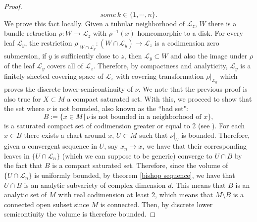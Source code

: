 \documentclass[12pt,twoside,a4paper]{report}
\newcommand{\nat}{\ensuremath{ \mathbb N }}
\begin{document}
\begin{proof}
$${some }\,k\in\lbrace 1,\cdots,n\rbrace.
$$
We prove this fact locally. Given a tubular neighborhood of $\mathcal{L}_z$,
$W$ there is a bundle retraction $\rho: W\rightarrow\mathcal{L}_z$ with $\rho^{-1}(x)$
homeomorphic to a disk. For every leaf $\mathcal{L}_y$, the restriction $\rho\vert_{W\cap\mathcal{L}_y}:(W\cap\mathcal{L}_y)\rightarrow\mathcal{L}_z$
is a codimension zero submersion, if $y$ is sufficiently close to $z$, then
$\mathcal{L}_y\subset W$ and also the image under $\rho$ of the leaf $\mathcal{L}_y$ covers all of $\mathcal{L}_z$.
Therefore, by compactness and analyticity, $\mathcal{L}_y$ is a finitely sheeted covering space of $\mathcal{L}_z$ with covering transformation
$\rho\vert_{\mathcal{L}_y}$ which proves the discrete lower-semicontinuity of $\nu$.
We note that the previous proof is also true for $X\subset M$ a compact saturated set.  With
this, we proceed to show that the set where $\nu$ is not bounded, also known as
the ``bad set":
$$
B:=\lbrace x\in M\,\vert\, \nu\,\text{is not bounded in a neighborhood of }x\rbrace,
$$
is a saturated compact set of codimension greater or equal to 2 (see \cite{Epstein}). For
each $x\in B$ there exists a chart around $x$, $U\subset M$ such that
$\nu\vert_U$ is bounded. Therefore, given a convergent sequence in $U$,
say $x_n\rightarrow x$, we have that their corresponding leaves in $\lbrace
U\cap\mathcal{L}_n\rbrace$ (which we can suppose to be generic) converge to
$U\cap B$ by the fact that $B$ is a compact saturated set. Therefore, since the
volume of $\lbrace U\cap\mathcal{L}_n\rbrace$ is uniformly bounded, by theorem
\ref{bishop sequence}, we have that $U \cap B$ is an analytic subvariety of
complex dimension $d$. This means that $B$ is an analytic set of $M$ with real
codimension at least 2, which means that $M\setminus B$ is a connected open
subset since $M$ is connected. Then, by discrete lower semicontiuity the volume is therefore bounded.



\end{proof}
\end{document}
